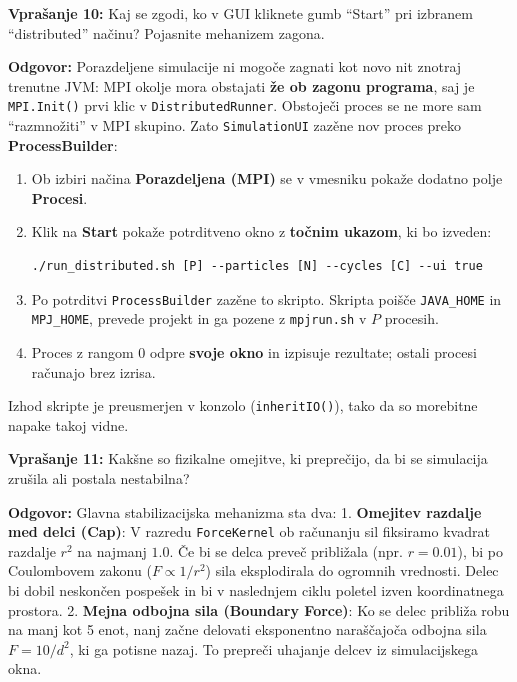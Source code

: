 \documentclass[11pt,a4paper]{article}
\begin{document}
\begin{vprasanje}
\textbf{Vprašanje 10:} Kaj se zgodi, ko v GUI kliknete gumb ``Start'' pri izbranem ``distributed'' načinu? Pojasnite mehanizem zagona.

\textbf{Odgovor:}
Porazdeljene simulacije ni mogoče zagnati kot novo nit znotraj trenutne JVM: MPI okolje mora obstajati \textbf{\v{z}e ob zagonu programa}, saj je \texttt{MPI.Init()} prvi klic v \texttt{DistributedRunner}. Obstoje\v{c}i proces se ne more sam ``razmno\v{z}iti'' v MPI skupino. Zato \texttt{SimulationUI} zaz\v{e}ne nov proces preko \textbf{ProcessBuilder}:
\begin{enumerate}
    \item Ob izbiri na\v{c}ina \textbf{Porazdeljena (MPI)} se v vmesniku poka\v{z}e dodatno polje \textbf{Procesi}.
    \item Klik na \textbf{Start} poka\v{z}e potrditveno okno z \textbf{to\v{c}nim ukazom}, ki bo izveden:
    \begin{lstlisting}[basicstyle=\ttfamily\footnotesize,numbers=none]
./run_distributed.sh [P] --particles [N] --cycles [C] --ui true
    \end{lstlisting}
    \item Po potrditvi \texttt{ProcessBuilder} zaz\v{e}ne to skripto. Skripta poi\v{s}\v{c}e \texttt{JAVA\_HOME} in \texttt{MPJ\_HOME}, prevede projekt in ga pozene z \texttt{mpjrun.sh} v $P$ procesih.
    \item Proces z rangom 0 odpre \textbf{svoje okno} in izpisuje rezultate; ostali procesi ra\v{c}unajo brez izrisa.
\end{enumerate}
Izhod skripte je preusmerjen v konzolo (\texttt{inheritIO()}), tako da so morebitne napake takoj vidne.
\end{vprasanje}

\begin{vprasanje}
\textbf{Vprašanje 11:} Kakšne so fizikalne omejitve, ki preprečijo, da bi se simulacija zrušila ali postala nestabilna?

\textbf{Odgovor:}
Glavna stabilizacijska mehanizma sta dva:
1. \textbf{Omejitev razdalje med delci (Cap)}: V razredu \texttt{ForceKernel} ob računanju sil fiksiramo kvadrat razdalje $r^2$ na najmanj $1.0$. Če bi se delca preveč približala (npr. $r = 0.01$), bi po Coulombovem zakonu ($F \propto 1/r^2$) sila eksplodirala do ogromnih vrednosti. Delec bi dobil neskončen pospešek in bi v naslednjem ciklu poletel izven koordinatnega prostora.
2. \textbf{Mejna odbojna sila (Boundary Force)}: Ko se delec približa robu na manj kot 5 enot, nanj začne delovati eksponentno naraščajoča odbojna sila $F = 10 / d^2$, ki ga potisne nazaj. To prepreči uhajanje delcev iz simulacijskega okna.
\end{vprasanje}
\end{document}
